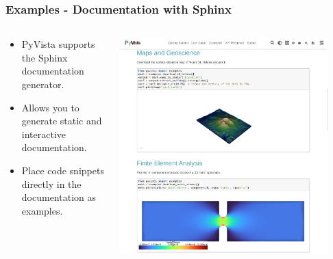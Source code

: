 \documentclass[t]{beamer}
\begin{document}
\begin{frame}
  \frametitle{Examples - Documentation with Sphinx}

  \vspace{-15pt}

  \begin{center}
    \begin{columns}[T]
      \begin{column}{.5\textwidth}
        \small
        \begin{itemize}
          \item PyVista supports the Sphinx documentation generator.
          \item Allows you to generate static and interactive documentation.
          \item Place code snippets directly in the documentation as examples.
        \end{itemize}
        \vspace{5pt}
        \inputminted[fontsize=\footnotesize]{bash}{code/sphinx_conf.py}
      \end{column}

      \begin{column}{.5\textwidth}
        \vspace{-5pt}
        \centering
        \href{https://docs.pyvista.org/}{\includegraphics[width=0.9\textwidth]{figures/sphinx.png}}
      \end{column}
    \end{columns}
  \end{center}

\end{frame}
\end{document}
